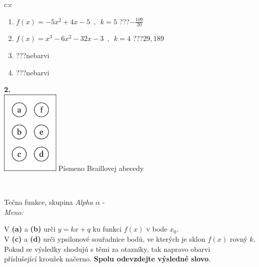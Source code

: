 \documentclass[10pt]{report}
\begin{document}
\begin{tabular}{c:c}
\begin{minipage}[c][104.5mm][t]{0.5\linewidth}
\begin{center}
\begin{minipage}{0.79\linewidth}
\begin{center}
\begin{varwidth}{\linewidth}
\begin{enumerate}
\item $f(x)=-5x^2+4x-5\enspace , \enspace k=5$\quad \dotfill\; ???\;\dotfill \quad $-\frac{109}{20}$
\item $f(x)=x^3-6x^2-32x-3\enspace , \enspace k=4$\quad \dotfill\; ???\;\dotfill \quad $29 , 189$
\item \quad \dotfill\; ???\;\dotfill \quad nebarvi
\item \quad \dotfill\; ???\;\dotfill \quad nebarvi
\end{enumerate}
\end{varwidth}
\end{center}
\end{minipage}
\begin{minipage}{0.20\linewidth}
\begin{center}
{\Huge\bfseries 2.} \\[2mm]
\includegraphics[height=40mm]{../images/braille.png}
{\small Písmeno Braillovej abecedy}
\end{center}
\end{minipage}
\end{center}
\end{minipage}
\\ \hdashline
\begin{minipage}[c][104.5mm][t]{0.5\linewidth}
\begin{center}
\vspace{7mm}
{\huge Tečna funkce, skupina \textit{Alpha $\alpha$} -}\\[5mm]
\textit{Meno:}\phantom{xxxxxxxxxxxxxxxxxxxxxxxxxxxxxxxxxxxxxxxxxxxxxxxxxxxxxxxxxxxxxxxxx}\\[5mm]
\begin{minipage}{0.95\linewidth}
\begin{center}
V \textbf{(a)} a \textbf{(b)} urči  $y = kx + q$ ku funkci $f(x)$ v bode $x_0$.\\V \textbf{(c)} a \textbf{(d)} urči ypsilonové souřadnice bodů, ve kterých je sklon $f(x)$ rovný $k$.\\Pokud se výsledky shodujú s těmi za otazníky, tak napravo obarvi\\příslušející kroužek načerno. \textbf{Spolu odevzdejte výsledné slovo}.

\end{center}
\end{minipage}
\end{center}
\end{minipage}
\end{tabular}
\end{document}
